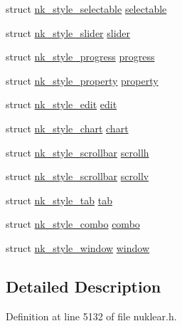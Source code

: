 \begin{DoxyCompactItemize}
\item 
struct \mbox{\hyperlink{structnk__style__selectable}{nk\+\_\+style\+\_\+selectable}} \mbox{\hyperlink{structnk__style_a7c05a97b375483b83cedf51932334357}{selectable}}
\item 
struct \mbox{\hyperlink{structnk__style__slider}{nk\+\_\+style\+\_\+slider}} \mbox{\hyperlink{structnk__style_ac3f3abfee5be6a0fa96f8cbf0c63d77e}{slider}}
\item 
struct \mbox{\hyperlink{structnk__style__progress}{nk\+\_\+style\+\_\+progress}} \mbox{\hyperlink{structnk__style_a8064c6b388f735cff32d4951c6156c9a}{progress}}
\item 
struct \mbox{\hyperlink{structnk__style__property}{nk\+\_\+style\+\_\+property}} \mbox{\hyperlink{structnk__style_a6af2c48298dd1c358751c70c59b91924}{property}}
\item 
struct \mbox{\hyperlink{structnk__style__edit}{nk\+\_\+style\+\_\+edit}} \mbox{\hyperlink{structnk__style_a2e6872e44b048d5e562994b0f9acc4eb}{edit}}
\item 
struct \mbox{\hyperlink{structnk__style__chart}{nk\+\_\+style\+\_\+chart}} \mbox{\hyperlink{structnk__style_a61bfb1b8d07189d9ba529c666e42e886}{chart}}
\item 
struct \mbox{\hyperlink{structnk__style__scrollbar}{nk\+\_\+style\+\_\+scrollbar}} \mbox{\hyperlink{structnk__style_a3ba589ca868f99b7dfcffce8e788c7a9}{scrollh}}
\item 
struct \mbox{\hyperlink{structnk__style__scrollbar}{nk\+\_\+style\+\_\+scrollbar}} \mbox{\hyperlink{structnk__style_a11ec083ec9db3bdb607dd9fb74eac901}{scrollv}}
\item 
struct \mbox{\hyperlink{structnk__style__tab}{nk\+\_\+style\+\_\+tab}} \mbox{\hyperlink{structnk__style_a50ba7d1509135829d80fe1448cbff2b1}{tab}}
\item 
struct \mbox{\hyperlink{structnk__style__combo}{nk\+\_\+style\+\_\+combo}} \mbox{\hyperlink{structnk__style_ae206fbbb12d966b970cf291ca54e43ac}{combo}}
\item 
struct \mbox{\hyperlink{structnk__style__window}{nk\+\_\+style\+\_\+window}} \mbox{\hyperlink{structnk__style_abab238d75bb12b1270171909a9b3e21a}{window}}
\end{DoxyCompactItemize}


\subsection{Detailed Description}


Definition at line 5132 of file nuklear.\+h.




